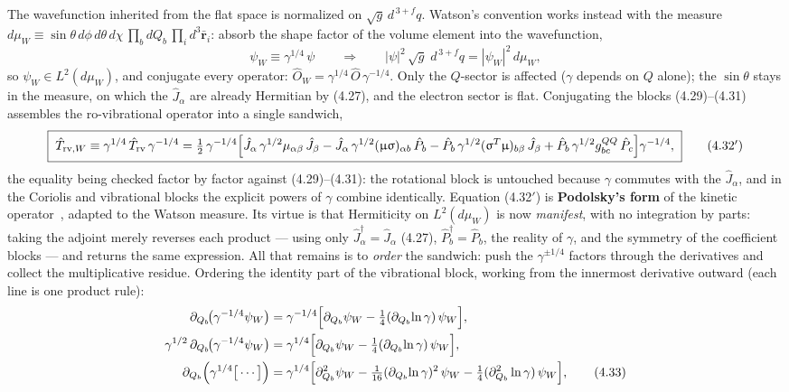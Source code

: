 The wavefunction inherited from the flat space is normalized on $\sqrt g\,d^{\,3+f}q$. Watson's convention works instead with the measure $d\mu_W\equiv\sin\theta\,d\phi\,d\theta\,d\chi\,\prod_bdQ_b\,\prod_id^3\bar{\mathbf r}_i$: absorb the shape factor of the volume element into the wavefunction,
\begin{equation}
\psi_W\equiv\gamma^{1/4}\,\psi
\qquad\Longrightarrow\qquad
|\psi|^{2}\,\sqrt g\;d^{\,3+f}q=|\psi_W|^{2}\,d\mu_W , \tag{4.32}
\end{equation}
so $\psi_W\in L^{2}(d\mu_W)$, and conjugate every operator: $\hat O_W=\gamma^{1/4}\,\hat O\,\gamma^{-1/4}$. Only the $Q$-sector is affected ($\gamma$ depends on $Q$ alone); the $\sin\theta$ stays in the measure, on which the $\hat J_\alpha$ are already Hermitian by (4.27), and the electron sector is flat. Conjugating the blocks (4.29)--(4.31) assembles the ro-vibrational operator into a single sandwich,
\begin{equation}
\boxed{\;\hat T_{\mathrm{rv},W}\equiv\gamma^{1/4}\,\hat T_{\mathrm{rv}}\,\gamma^{-1/4}
=\tfrac12\,\gamma^{-1/4}\Bigl[\hat J_\alpha\,\gamma^{1/2}\mu_{\alpha\beta}\,\hat J_\beta
-\hat J_\alpha\,\gamma^{1/2}(\upmu\upsigma)_{\alpha b}\,\hat P_b
-\hat P_b\,\gamma^{1/2}(\upsigma^{T}\upmu)_{b\beta}\,\hat J_\beta
+\hat P_b\,\gamma^{1/2}g^{QQ}_{bc}\,\hat P_c\Bigr]\gamma^{-1/4},\;}\tag{4.32$'$}
\end{equation}
the equality being checked factor by factor against (4.29)--(4.31): the rotational block is untouched because $\gamma$ commutes with the $\hat J_\alpha$, and in the Coriolis and vibrational blocks the explicit powers of $\gamma$ combine identically. Equation (4.32$'$) is \textbf{Podolsky's form} of the kinetic operator~\cite{podolsky1928}, adapted to the Watson measure. Its virtue is that Hermiticity on $L^{2}(d\mu_W)$ is now \emph{manifest}, with no integration by parts: taking the adjoint merely reverses each product --- using only $\hat J_\alpha^{\dagger}=\hat J_\alpha$ (4.27), $\hat P_b^{\dagger}=\hat P_b$, the reality of $\gamma$, and the symmetry of the coefficient blocks --- and returns the same expression. All that remains is to \emph{order} the sandwich: push the $\gamma^{\pm1/4}$ factors through the derivatives and collect the multiplicative residue. Ordering the identity part of the vibrational block, working from the innermost derivative outward (each line is one product rule):
\begin{align}
\partial_{Q_b}\!\bigl(\gamma^{-1/4}\psi_W\bigr)&=\gamma^{-1/4}\Bigl[\partial_{Q_b}\psi_W-\tfrac14(\partial_{Q_b}\!\ln\gamma)\,\psi_W\Bigr],\nonumber\\
\gamma^{1/2}\,\partial_{Q_b}\!\bigl(\gamma^{-1/4}\psi_W\bigr)&=\gamma^{1/4}\Bigl[\partial_{Q_b}\psi_W-\tfrac14(\partial_{Q_b}\!\ln\gamma)\,\psi_W\Bigr],\nonumber\\
\partial_{Q_b}\Bigl(\gamma^{1/4}\bigl[\,\cdots\,\bigr]\Bigr)&=\gamma^{1/4}\Bigl[\partial_{Q_b}^{2}\psi_W-\tfrac{1}{16}(\partial_{Q_b}\!\ln\gamma)^{2}\,\psi_W-\tfrac14(\partial_{Q_b}^{2}\ln\gamma)\,\psi_W\Bigr], \tag{4.33}
\end{align}
